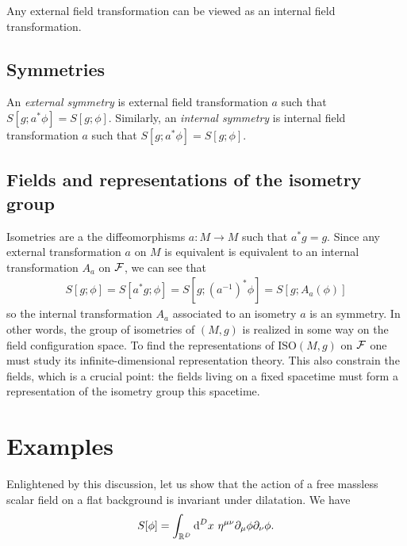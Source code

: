 \documentclass[a4paper,10pt]{article}
\begin{document}
        \begin{prop}
            Any external field transformation can be viewed as an internal field transformation.
        \end{prop}

    \subsection{Symmetries}

        An \emph{external symmetry} is external field transformation $a$ such that $S[g;a^*\phi]=S[g;\phi]$. Similarly, an \emph{internal symmetry} is internal field transformation $a$ such that $S[g;a^*\phi]=S[g;\phi]$.

    \subsection{Fields and representations of the isometry group}

        Isometries are a the diffeomorphisms $a:M\to M$ such that $a^*g=g$. Since any external transformation $a$ on $M$ is equivalent is equivalent to an internal transformation $A_a$ on $\mathcal{F}$, we can see that
        \begin{eqnarray}
            S[g;\phi]=S[a^*g;\phi]=S[g;(a^{-1})^*\phi]=S[g;A_a(\phi)]
        \end{eqnarray}
        so the internal transformation $A_a$ associated to an isometry $a$ is an symmetry. In other words, the group of isometries of $(M,g)$ is realized in some way on the field configuration space. To find the representations of $\text{ISO}(M,g)$ on $\mathcal{F}$ one must study its infinite-dimensional representation theory. This also constrain the fields, which is a crucial point: the fields living on a fixed spacetime must form a representation of the isometry group this spacetime. 
    
\section{Examples}

    \begin{examp}
            Enlightened by this discussion, let us show that the action of a free massless scalar field on a flat background is invariant under dilatation. We have
            \begin{equation}
                S[\phi]=\int_{\mathbb{R}^D}\text{d}^Dx~\eta^{\mu\nu}\partial_\mu\phi\partial_\nu\phi.
            \end{equation}
    \end{examp}

\pagebreak

\nocite{*}



\printbibliography
\end{document}
